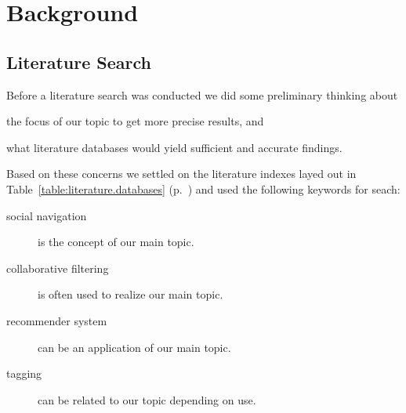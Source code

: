 \chapter{Background}
\label{chapter:background}

%
%
%
%
%
%
%

\section{Literature Search}

Before a literature search was conducted we did some preliminary thinking
about
\begin{inparaenum}[(a)]
  \item the focus of our topic to get more precise results, and
  \item what literature databases would yield sufficient and accurate
    findings.
\end{inparaenum}
Based on these concerns we settled on the literature indexes layed out in
Table~\ref{table:literature.databases}
(p.~\pageref{table:literature.databases}) and used the following keywords%
for seach:

\begin{description}
  \item[social navigation] is the concept of our main topic.
  \item[collaborative filtering] is often used to realize our main topic.
  \item[recommender system] can be an application of our main topic.
  \item[tagging] can be related to our topic depending on use.
\end{description}

